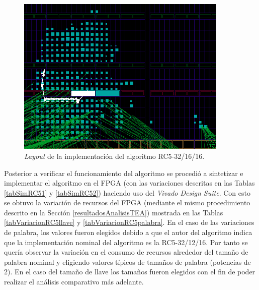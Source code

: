 \begin{figure}
	\includegraphics[width=0.9\textwidth]{./images/fig32_16_16_layout}
	\caption{\textit{Layout} de la implementación del algoritmo RC5-32/16/16.}
	\label{fig32_16_16_layout}
\end{figure}

Posterior a verificar el funcionamiento del algoritmo se procedió a sintetizar e implementar el algoritmo en el FPGA (con las variaciones descritas en las Tablas \ref{tabSimRC51} y \ref{tabSimRC52}) haciendo uso del \textit{Vivado Design Suite}. Con esto se obtuvo la variación de recursos del FPGA (mediante el mismo procedimiento descrito en la Sección \ref{resultadosAnalisisTEA}) mostrada en las Tablas \ref{tabVariacionRC5llave} y \ref{tabVariacionRC5palabra}. En el caso de las variaciones de palabra, los valores fueron elegidos debido a que el autor del algoritmo indica que la implementación nominal del algoritmo es la RC5-32/12/16. Por tanto se quería observar la variación en el consumo de recursos alrededor del tamaño de palabra nominal y eligiendo valores típicos de tamaños de palabra (potencias de 2). En el caso del tamaño de llave los tamaños fueron elegidos con el fin de poder realizar el análisis comparativo más adelante.

